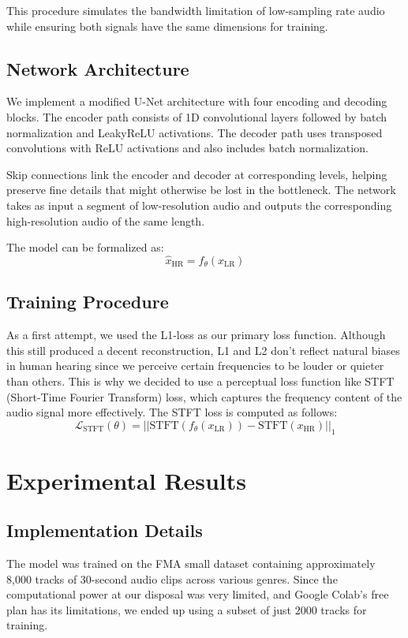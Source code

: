 \documentclass{article}
\begin{document}
This procedure simulates the bandwidth limitation of low-sampling rate audio while ensuring both signals have the same dimensions for training.

\subsection{Network Architecture}
We implement a modified U-Net architecture with four encoding and decoding blocks.
The encoder path consists of 1D convolutional layers followed by batch normalization and LeakyReLU activations.
The decoder path uses transposed convolutions with ReLU activations and also includes batch normalization.

Skip connections link the encoder and decoder at corresponding levels, helping preserve fine details that might otherwise be lost in the bottleneck.
The network takes as input a segment of low-resolution audio and outputs the corresponding high-resolution audio of the same length.

The model can be formalized as:
\begin{equation}
\hat{x}_{\text{HR}} = f_\theta(x_{\text{LR}})
\end{equation}

\subsection{Training Procedure}
As a first attempt, we used the L1-loss as our primary loss function.
Although this still produced a decent reconstruction, L1 and L2 don't reflect natural biases in human hearing since we perceive certain frequencies to be louder or quieter than others.
This is why we decided to use a perceptual loss function like STFT (Short-Time Fourier Transform) loss, which captures the frequency content of the audio signal more effectively.
The STFT loss is computed as follows:
\begin{equation}
\mathcal{L}_{\text{STFT}}(\theta) = ||\text{STFT}(f_\theta(x_{\text{LR}})) - \text{STFT}(x_{\text{HR}})||_1
\end{equation}

\section{Experimental Results}

\subsection{Implementation Details}
The model was trained on the FMA small dataset containing approximately 8,000 tracks of 30-second audio clips across various genres.
Since the computational power at our disposal was very limited, and Google Colab's free plan has its limitations, we ended up using a subset of just 2000 tracks for training.
\end{document}
